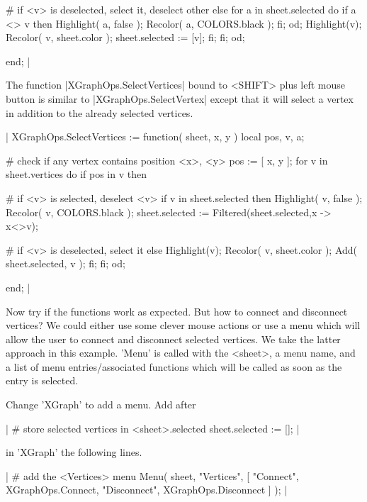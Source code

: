                 # if <v> is deselected, select it, deselect other
                else
                    for a  in sheet.selected  do
                        if a <> v  then
                            Highlight( a, false );
                            Recolor( a, COLORS.black );
                        fi;
                    od;
                    Highlight(v);
                    Recolor( v, sheet.color );
                    sheet.selected := [v];
                fi;
            fi;
        od;

    end; |

The function |XGraphOps.SelectVertices| bound to  <SHIFT> plus left mouse
button is similar to |XGraphOps.SelectVertex|  except that it will select
a vertex in addition to the already selected vertices.

|    XGraphOps.SelectVertices := function( sheet, x, y )
        local   pos,  v,  a;

        # check if any vertex contains position <x>, <y>
        pos := [ x, y ];
        for v  in sheet.vertices  do
            if pos in v  then

                # if <v> is selected, deselect <v>
                if v in sheet.selected  then
                    Highlight( v, false );
                    Recolor( v, COLORS.black );
                    sheet.selected := Filtered(sheet.selected,x -> x<>v);

                # if <v> is deselected, select it
                else
                    Highlight(v);
                    Recolor( v, sheet.color );
                    Add( sheet.selected, v );
                fi;
            fi;
        od;

    end; |

Now try  if the  functions  work as  expected.   But  how to connect  and
disconnect  vertices?  We could either  use some clever  mouse actions or
use a menu  which will allow the  user to connect and disconnect selected
vertices.  We take the latter approach  in this example. 'Menu' is called
with the  <sheet>, a  menu name, and  a  list of menu  entries/associated
functions which will be called as soon as the entry is selected.

Change 'XGraph' to add a menu. Add after

|    # store selected vertices in <sheet>.selected
    sheet.selected := []; |

in 'XGraph' the following lines.

|    # add the <Vertices> menu
    Menu( sheet, "Vertices",
          [ "Connect",    XGraphOps.Connect,
            "Disconnect", XGraphOps.Disconnect ] ); |

